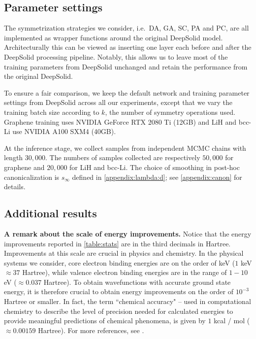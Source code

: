 \subsection{Parameter settings} \label{appendix:experiment:parameters}

The symmetrization strategies we consider, i.e.~DA, GA, SC, PA and PC, are all implemented as wrapper functions around the original DeepSolid model. Architecturally this can be viewed as inserting one layer each before and after the DeepSolid processing pipeline. Notably, this allows us to leave most of the training parameters from DeepSolid unchanged and retain the performance from the original DeepSolid.

\vspace{.5em}

To ensure a fair comparison, we keep the default network and training parameter settings from DeepSolid across all our experiments, except that we vary the training batch size according to $k$, the number of symmetry operations used. Graphene training uses NVIDIA GeForce RTX 2080 Ti (12GB) and LiH and bcc-Li use NVIDIA A100 SXM4 (40GB).

\vspace{.5em}

At the inference stage, we collect samples from independent MCMC chains with length $30,000$. The numbers of samples collected are respectively $50,000$ for graphene and $20,000$ for LiH and bcc-Li. The choice of smoothing in post-hoc canonicalization is $s_\infty$ defined in \cref{appendix:lambda:d}; see \cref{appendix:canon} for details.

\vspace{-.5em}

\subsection{Additional results} \label{appendix:add:fig}

\textbf{A remark about the scale of energy improvements.} Notice that the energy improvements reported in \cref{table:stats} are in the third decimals in Hartree. Improvements at this scale are crucial in %
physics and chemistry. In the physical systems we consider, core electron binding energies are on the order of keV ($1$ keV $\approx 37$ Hartree), while valence electron binding energies are in the range of $1-10$ eV ($\approx 0.037$ Hartree). To obtain wavefunctions with accurate ground state energy, it is therefore crucial to obtain energy improvements on the order of $10^{-3}$ Hartree or smaller. In fact, the term ``chemical accuracy" -- used in computational chemistry to describe the level of precision needed for calculated energies to provide meaningful predictions of chemical phenomena, is given by $1$ kcal / mol ($\approx 0.00159$ Hartree). For more references, see \citet{williams2020direct,perdew1996generalized}.

